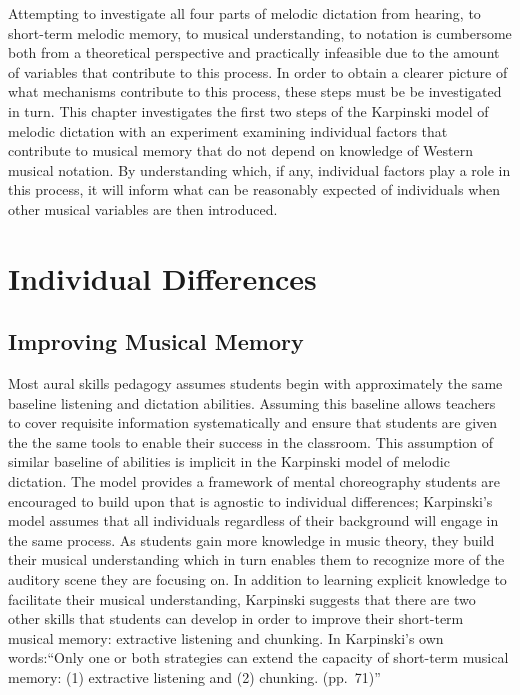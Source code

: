 \documentclass[]{book}
\begin{document}
Attempting to investigate all four parts of melodic dictation from hearing, to short-term melodic memory, to musical understanding, to notation is cumbersome both from a theoretical perspective and practically infeasible due to the amount of variables that contribute to this process.
In order to obtain a clearer picture of what mechanisms contribute to this process, these steps must be be investigated in turn.
This chapter investigates the first two steps of the Karpinski model of melodic dictation \citep{karpinskiAuralSkillsAcquisition2000, karpinskiModelMusicPerception1990} with an experiment examining individual factors that contribute to musical memory that do not depend on knowledge of Western musical notation.
By understanding which, if any, individual factors play a role in this process, it will inform what can be reasonably expected of individuals when other musical variables are then introduced.

\hypertarget{individual-differences-1}{%
\section{Individual Differences}\label{individual-differences-1}}

\hypertarget{improving-musical-memory}{%
\subsection{Improving Musical Memory}\label{improving-musical-memory}}

Most aural skills pedagogy assumes students begin with approximately the same baseline listening and dictation abilities.
Assuming this baseline allows teachers to cover requisite information systematically and ensure that students are given the the same tools to enable their success in the classroom.
This assumption of similar baseline of abilities is implicit in the Karpinski model of melodic dictation.
The model provides a framework of mental choreography students are encouraged to build upon that is agnostic to individual differences; Karpinski's model assumes that all individuals regardless of their background will engage in the same process.
As students gain more knowledge in music theory, they build their musical understanding which in turn enables them to recognize more of the auditory scene they are focusing on.
In addition to learning explicit knowledge to facilitate their musical understanding, Karpinski suggests that there are two other skills that students can develop in order to improve their short-term musical memory: extractive listening and chunking.
In Karpinski's own words:``Only one or both strategies can extend the capacity of short-term musical memory: (1) extractive listening and (2) chunking. (pp.~71)''
\end{document}
